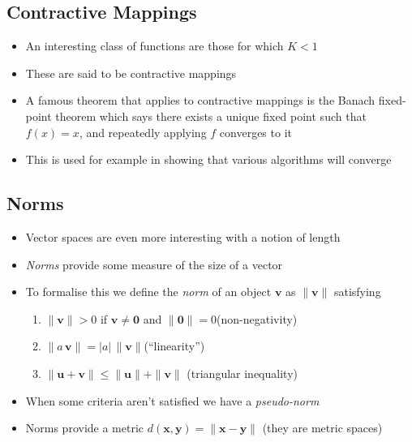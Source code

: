 \begin{slide}
\section{Contractive Mappings}

\begin{PauseHighLight}
  \begin{itemize}
  \item An interesting class of functions are those for which
    $K<1$\pause
  \item These are said to be contractive mappings\pause
  \item A famous theorem that applies to contractive mappings is the
    Banach fixed-point theorem which says there exists a unique fixed
    point such that $f(x) = x$, and repeatedly applying $f$ converges
    to it\pause
  \item This is used for example in showing that various algorithms
    will converge\pause
  \end{itemize}
\end{PauseHighLight}

\end{slide}


\Outline

\begin{slide}
\section[-2]{Norms}

\begin{PauseHighLight}
  \begin{itemize}
  \item Vector spaces are even more interesting with a notion of length\pause
  \item \emph{Norms} provide some measure of the size of a vector\pause
  \item To formalise this we define the \emph{norm} of an object
    $\bm{v}$ as  $\|\bm{v}\|$ satisfying
    \begin{enumerate}
    \item $\| \bm{v} \| >0$ if $\bm{v}\neq\bm{0}$ and $\|\bm{0}\|=0 $\hfill(non-negativity)\pause
    \item $\| a\,\bm{v} \| = |a| \, \| \bm{v} \|$\hfill(``linearity'')\pause
    \item $\| \bm{u} + \bm{v} \| \leq \| \bm{u} \| + \| \bm{v} \|$
      \hfill (triangular inequality)\pause
    \end{enumerate}
  \item When some criteria aren't satisfied we have a
    \emph{pseudo-norm}\pause
  \item Norms provide a metric $d(\bm{x}, \bm{y}) = \|\bm{x}-\bm{y}\|$
    (they are metric spaces)\pause
  \end{itemize}
\end{PauseHighLight}

\end{slide}


